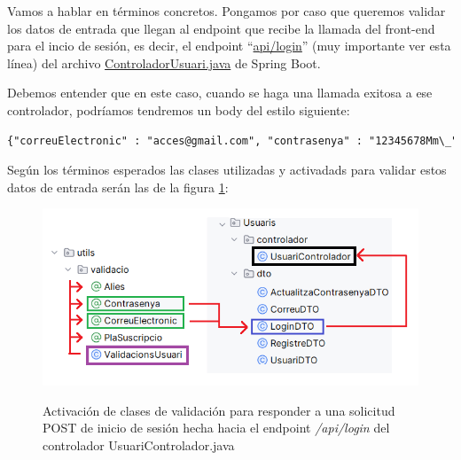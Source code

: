 \documentclass[a4paper,12pt]{report}
\begin{document}
			
			Vamos a hablar en términos concretos. Pongamos por caso que queremos validar los datos de entrada que llegan al endpoint que recibe la llamada del front-end para el incio de sesión, es decir, el endpoint ``\href{https://github.com/blackcub3s/mercApp/blob/4ddc34194763af7a246ffabb14146ad9b4b2c5db/APP%20WEB/__springboot__produccio__/app/src/main/java/miApp/app/Usuaris/controlador/UsuariControlador.java#104}{api/login}'' (muy importante ver esta línea) del archivo \href{https://github.com/blackcub3s/mercApp/blob/main/APP%20WEB/__springboot__produccio__/app/src/main/java/miApp/app/Usuaris/controlador/UsuariControlador.java}{ControladorUsuari.java} de Spring Boot. 
			
			Debemos entender que en este caso, cuando se haga una llamada exitosa a ese controlador, podríamos tendremos un body del estilo siguiente:
			
				
			\begin{lstlisting}[language=xml, basicstyle=\ttfamily\footnotesize, keywordstyle=\color{magenta}]
{"correuElectronic" : "acces@gmail.com", "contrasenya" : "12345678Mm\_" }
			\end{lstlisting}
			
	
			

			
			Según los términos esperados las clases utilizadas y activadads para validar estos datos de entrada serán las de la figura \ref{fig:validacioBackArxiusDetallLoginVA}:
			
			
			
			\FloatBarrier
			\setlength{\belowcaptionskip}{3pt}
			\begin{figure}[H]
				\centering
				\caption{Activación de clases de validación para responder a una solicitud POST de inicio de sesión hecha hacia el endpoint \textit{/api/login} del controlador UsuariControlador.java}
				\includegraphics[width=1\linewidth]{img/validacioBackArxiusDetallLoginVA}
				\label{fig:validacioBackArxiusDetallLoginVA}
			\end{figure}
			\FloatBarrier
			
\end{document}
